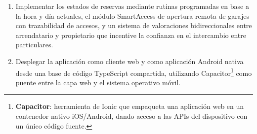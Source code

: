 \begin{enumerate}
  \item[\textbf{OE6.}] Implementar los estados de reservas mediante rutinas programadas en base a la hora y día actuales, el módulo SmartAccess de apertura remota de garajes con trazabilidad de accesos, y un sistema de valoraciones bidireccionales entre arrendatario y propietario que incentive la confianza en el intercambio entre particulares.

  \item[\textbf{OE7.}] Desplegar la aplicación como cliente web y como aplicación Android nativa desde una base de código TypeScript compartida, utilizando Capacitor\footnote{\textbf{Capacitor}: herramienta de Ionic que empaqueta una aplicación web en un contenedor nativo iOS/Android, dando acceso a las APIs del dispositivo con un único código fuente.} como puente entre la capa web y el sistema operativo móvil.


\end{enumerate}
